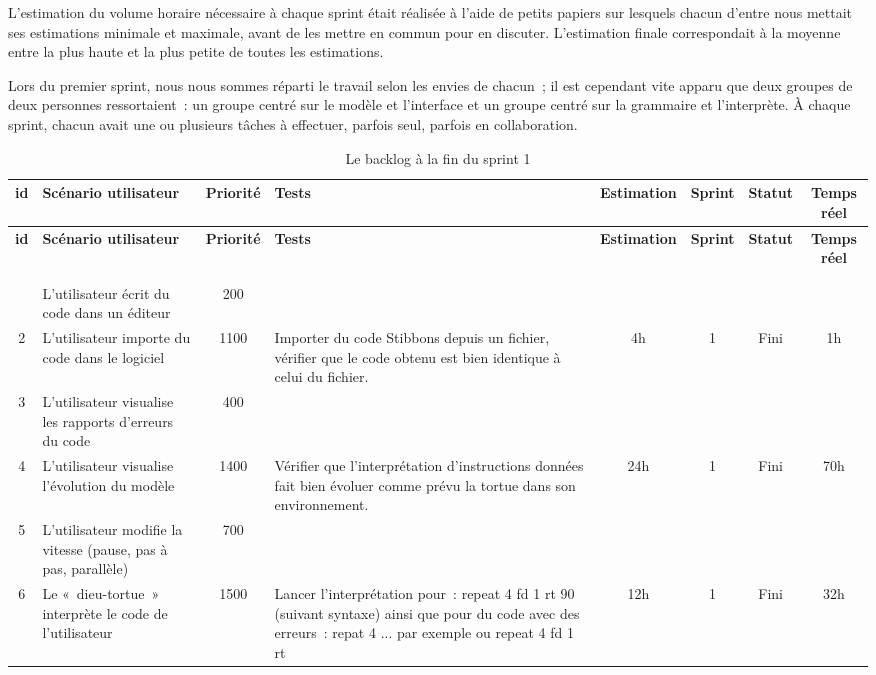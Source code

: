 L'estimation du volume horaire nécessaire à chaque sprint était réalisée à l'aide de petits papiers sur lesquels chacun d'entre nous mettait ses estimations minimale et maximale, avant de les mettre en commun pour en discuter. L'estimation finale correspondait à la moyenne entre la plus haute et la plus petite de toutes les estimations.

Lors du premier sprint, nous nous sommes réparti le travail selon les envies de chacun~; il est cependant vite apparu que deux groupes de deux personnes ressortaient~: un groupe centré sur le modèle et l'interface et un groupe centré sur la grammaire et l'interprète.
À chaque sprint, chacun avait une ou plusieurs tâches à effectuer, parfois seul, parfois en collaboration.

{\tiny
\begin{longtable}[c]{|c|p{2cm}|c|p{4cm}|*{4}{c|}}
\hline
\bf id & \bf Scénario utilisateur & \bf Priorité & \bf Tests & \bf Estimation & \bf Sprint & \bf Statut & \bf Temps réel \\
\hline
\endfirsthead
\hline
\bf id & \bf Scénario utilisateur & \bf Priorité & \bf Tests & \bf Estimation & \bf Sprint & \bf Statut & \bf Temps réel \\
\hline
\endhead
\hline
\caption{Le backlog à la fin du sprint 1} \label{bsp1}\\
\endlastfoot
\hline
\caption[]{Le backlog à la fin du sprint 1}\\
\endfoot
1 & L'utilisateur écrit du code dans un éditeur & 200 &  &  &  &  &  \\
\hline
2 & L'utilisateur importe du code dans le logiciel & 1100 & Importer du code Stibbons depuis un fichier, vérifier que le code obtenu est bien identique à celui du fichier. & 4h & 1 & Fini & 1h \\
\hline
3 & L'utilisateur visualise les rapports d'erreurs du code & 400 &  &  &  &  &  \\
\hline
4 & L'utilisateur visualise l'évolution du modèle & 1400 & Vérifier que l'interprétation d'instructions données fait bien évoluer comme prévu la tortue dans son environnement. & 24h & 1 & Fini & 70h \\
\hline
5 & L'utilisateur modifie la vitesse (pause, pas à pas, parallèle) & 700 &  &  &  &  &  \\
\hline
6 & Le «~dieu-tortue~» interprète le code de l'utilisateur & 1500 & Lancer l'interprétation pour~: repeat 4 { fd 1 rt 90 } (suivant syntaxe) ainsi que pour du code avec des erreurs~: repat 4 {...} par exemple ou repeat 4 { fd 1 rt } & 12h & 1 & Fini & 32h \\

\end{longtable}}
